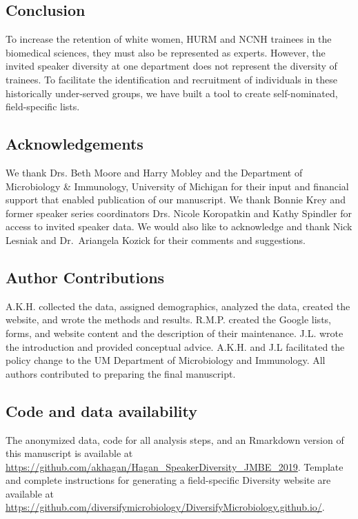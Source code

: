 \documentclass[10pt,]{article}
\begin{document}
\subsection{Conclusion}\label{conclusion}

To increase the retention of white women, HURM and NCNH trainees in the
biomedical sciences, they must also be represented as experts. However,
the invited speaker diversity at one department does not represent the
diversity of trainees. To facilitate the identification and recruitment
of individuals in these historically under-served groups, we have built
a tool to create self-nominated, field-specific lists.

\subsection{Acknowledgements}\label{acknowledgements}

We thank Drs. Beth Moore and Harry Mobley and the Department of
Microbiology \& Immunology, University of Michigan for their input and
financial support that enabled publication of our manuscript. We thank
Bonnie Krey and former speaker series coordinators Drs. Nicole
Koropatkin and Kathy Spindler for access to invited speaker data. We
would also like to acknowledge and thank Nick Lesniak and Dr.~Ariangela
Kozick for their comments and suggestions.

\subsection{Author Contributions}\label{author-contributions}

A.K.H. collected the data, assigned demographics, analyzed the data,
created the website, and wrote the methods and results. R.M.P. created
the Google lists, forms, and website content and the description of
their maintenance. J.L. wrote the introduction and provided conceptual
advice. A.K.H. and J.L facilitated the policy change to the UM
Department of Microbiology and Immunology. All authors contributed to
preparing the final manuscript.

\subsection{Code and data
availability}\label{code-and-data-availability}

The anonymized data, code for all analysis steps, and an Rmarkdown
version of this manuscript is available at
\url{https://github.com/akhagan/Hagan_SpeakerDiversity_JMBE_2019}.
Template and complete instructions for generating a field-specific
Diversity website are available at
\url{https://github.com/diversifymicrobiology/DiversifyMicrobiology.github.io/}.
\end{document}

